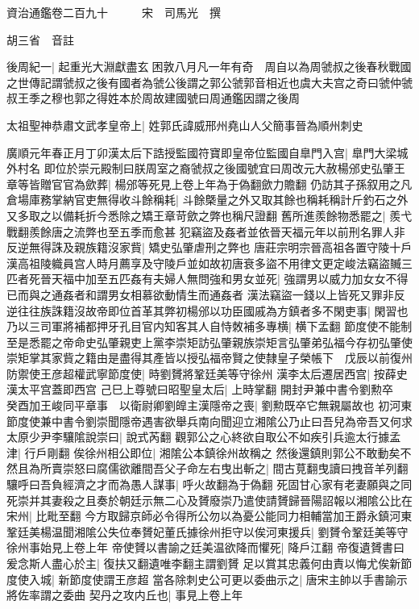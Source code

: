 資治通鑑卷二百九十　　　宋　司馬光　撰

胡三省　音註

後周紀一|{
	起重光大淵獻盡玄困敦八月凡一年有奇　周自以為周虢叔之後春秋戰國之世傳記謂虢叔之後有國者為虢公後謂之郭公虢郭音相近也虞大夫宫之奇曰虢仲虢叔王季之穆也郭之得姓本於周故建國號曰周通鑑因謂之後周}


太祖聖神恭肅文武孝皇帝上|{
	姓郭氏諱威邢州堯山人父簡事晉為順州刺史}


廣順元年春正月丁卯漢太后下誥授監國符寶即皇帝位監國自臯門入宫|{
	臯門大梁城外村名}
即位於崇元殿制曰朕周室之裔虢叔之後國號宜曰周改元大赦楊邠史弘肇王章等皆贈官官為歛葬|{
	楊邠等死見上卷上年為于偽翻歛力贍翻}
仍訪其子孫叙用之凡倉場庫務掌納官吏無得收斗餘稱耗|{
	斗餘槩量之外又取其餘也稱耗稱計斤釣石之外又多取之以備耗折今悉除之矯王章苛歛之弊也稱尺證翻}
舊所進羨餘物悉罷之|{
	羨弋戰翻羨餘唐之流弊也至五季而愈甚}
犯竊盜及姦者並依晉天福元年以前刑名罪人非反逆無得誅及親族籍沒家貲|{
	矯史弘肇虐刑之弊也}
唐莊宗明宗晉高祖各置守陵十戶漢高祖陵軄員宫人時月薦享及守陵戶並如故初唐衰多盜不用律文更定峻法竊盜贓三匹者死晉天福中加至五匹姦有夫婦人無問強和男女並死|{
	強謂男以威力加女女不得已而與之通姦者和謂男女相慕欲動情生而通姦者}
漢法竊盜一錢以上皆死又罪非反逆往往族誅籍沒故帝即位首革其弊初楊邠以功臣國戚為方鎮者多不閑吏事|{
	閑習也}
乃以三司軍將補都押牙孔目官内知客其人自恃敇補多專横|{
	横下孟翻}
節度使不能制至是悉罷之帝命史弘肇親吏上黨李崇矩訪弘肇親族崇矩言弘肇弟弘福今存初弘肇使崇矩掌其家貲之籍由是盡得其產皆以授弘福帝賢之使隸皇子榮帳下　戊辰以前復州防禦使王彦超權武寧節度使|{
	時劉贇將鞏廷美等守徐州}
漢李太后遷居西宫|{
	按薛史漢太平宫蓋即西宫}
己巳上尊號曰昭聖皇太后|{
	上時掌翻}
開封尹兼中書令劉勲卒　癸酉加王峻同平章事　以衛尉卿劉皥主漢隱帝之喪|{
	劉勲既卒它無親屬故也}
初河東節度使兼中書令劉崇聞隱帝遇害欲舉兵南向聞迎立湘隂公乃止曰吾兒為帝吾又何求太原少尹李驤隂說崇曰|{
	說式芮翻}
觀郭公之心終欲自取公不如疾引兵逾太行據孟津|{
	行戶剛翻}
俟徐州相公即位|{
	湘隂公本鎮徐州故稱之}
然後還鎮則郭公不敢動矣不然且為所賣崇怒曰腐儒欲離間吾父子命左右曳出斬之|{
	間古莧翻曳讀曰拽音羊列翻}
驤呼曰吾負經濟之才而為愚人謀事|{
	呼火故翻為于偽翻}
死固甘心家有老妻願與之同死崇并其妻殺之且奏於朝廷示無二心及贇廢崇乃遣使請贇歸晉陽詔報以湘隂公比在宋州|{
	比毗至翻}
今方取歸京師必令得所公勿以為憂公能同力相輔當加王爵永鎮河東鞏廷美楊温聞湘隂公失位奉贇妃董氏據徐州拒守以俟河東援兵|{
	劉贇令鞏廷美等守徐州事始見上卷上年}
帝使贇以書諭之廷美温欲降而懼死|{
	降戶江翻}
帝復遺贇書曰爰念斯人盡心於主|{
	復扶又翻遺唯李翻主謂劉贇}
足以賞其忠義何由責以悔尤俟新節度使入城|{
	新節度使謂王彦超}
當各除刺史公可更以委曲示之|{
	唐宋主帥以手書諭示將佐率謂之委曲}
契丹之攻内丘也|{
	事見上卷上年}
